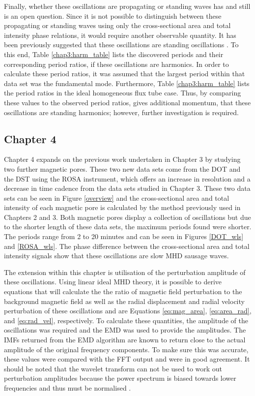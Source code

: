     Finally, whether these oscillations are propagating or standing waves has and still is an open question. 
    Since it is not possible to distinguish between these propagating or standing waves using only the cross-sectional area and total intensity phase relations, it would require another observable quantity.
    It has been previously suggested that these oscillations are standing oscillations \citep{morton2011}.
    To this end, Table \ref{chap3:harm_table} lists the discovered periods and their corresponding period ratios, if these oscillations are harmonics.
    In order to calculate these period ratios, it was assumed that the largest period within that data set was the fundamental mode. 
    Furthermore, Table \ref{chap3:harm_table} lists the period ratios in the ideal homogeneous flux tube case.       
    Thus, by comparing these values to the observed period ratios, gives additional momentum, that these oscillations are standing harmonics; however, further investigation is required.
    
    \subsection{Chapter 4}
    	
    Chapter 4 expands on the previous work undertaken in Chapter 3 by studying two further magnetic pores.
    These two new data sets come from the DOT and the DST using the ROSA instrument, which offers an increase in resolution and a decrease in time cadence from the data sets studied in Chapter 3.
    These two data sets can be seen in Figure \ref{overview} and the cross-sectional area and total intensity of each magnetic pore is calculated by the method previously used in Chapters 2 and 3. 
    Both magnetic pores display a collection of oscillations but due to the shorter length of these data sets, the maximum periods found were shorter.
    The periods range from 2 to 20 minutes and can be seen in Figures \ref{DOT_wls} and \ref{ROSA_wls}.     
    The phase difference between the cross-sectional area and total intensity signals show that these oscillations are slow MHD sausage waves.
    
    The extension within this chapter is utilisation of the perturbation amplitude of these oscillations.
    Using linear ideal MHD theory, it is possible to derive equations that will calculate the the ratio of magnetic field perturbation to the background magnetic field as well as the radial displacement and radial velocity perturbation of these oscillations and are Equations \ref{eq:mag_area}, \ref{eq:area_rad}, and \ref{eq:rad_vel}, respectively. 
    To calculate these quantities, the amplitude of the oscillations was required and the EMD was used to provide the amplitudes.
    The IMFs returned from the EMD algorithm are known to return close to the actual amplitude of the original frequency components.
    To make sure this was accurate, these values were compared with the FFT output and were in good agreement.
	It should be noted that the wavelet transform can not be used to work out perturbation amplitudes  because the power spectrum is biased towards lower frequencies and thus must be normalised \citep{liu2007rectification}.
  
